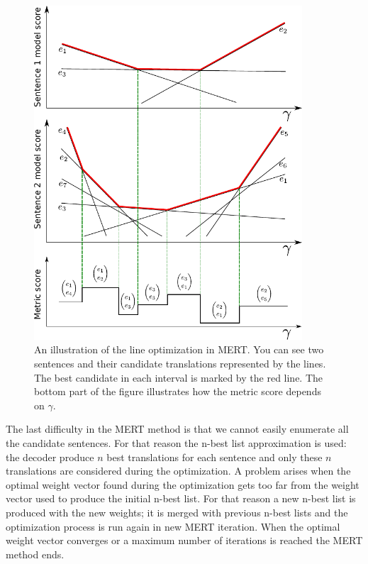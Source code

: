 \begin{figure}
    \begin{center}
        \includegraphics[width=10cm]{img/mert.pdf}
    \end{center}

    \caption[An illustration of the line optimization in MERT]{
      An illustration of the line optimization in MERT. You can see two sentences and their
      candidate translations represented by the lines. The best candidate in each interval
      is marked by the red line. The bottom part of the figure illustrates how the metric score
      depends on $\gamma$.
}

    \label{fig:lines}
\end{figure}

The last difficulty in the MERT method is that we cannot easily enumerate all
the candidate sentences. For that reason the n-best list approximation is used:
the decoder produce $n$ best translations for each sentence and only these $n$
translations are considered during the optimization. A problem arises when the
optimal weight vector found during the optimization gets too far from the
weight vector used to produce the initial n-best list. For that reason a new
n-best list is produced with the new weights; it is merged with previous n-best
lists and the optimization process is run again in new MERT iteration. When the
optimal weight vector converges or a maximum number of iterations is reached
the MERT method ends. 

